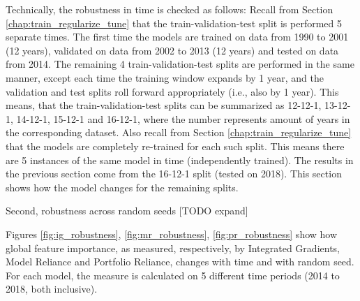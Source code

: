 		Technically, the robustness in time is checked as follows: Recall from Section \ref{chap:train_regularize_tune} that the train-validation-test split is performed 5 separate times. The first time the models are trained on data from 1990 to 2001 (12 years), validated on data from 2002 to 2013 (12 years) and tested on data from 2014. The remaining 4 train-validation-test splits are performed in the same manner, except each time the training window expands by 1 year, and the validation and test splits roll forward appropriately (i.e., also by 1 year). This means, that the train-validation-test splits can be summarized as 12-12-1, 13-12-1, 14-12-1, 15-12-1 and 16-12-1, where the number represents amount of years in the corresponding dataset. Also recall from Section \ref{chap:train_regularize_tune} that the models are completely re-trained for each such split. This means there are 5 instances of the same model in time (independently trained). The results in the previous section come from the 16-12-1 split (tested on 2018). This section shows how the model changes for the remaining splits.  
		
		Second, robustness across random seeds [TODO expand]
		
		Figures \ref{fig:ig_robustness}, \ref{fig:mr_robustness}, \ref{fig:pr_robustness} show how global feature importance, as measured, respectively, by Integrated Gradients, Model Reliance and Portfolio Reliance, changes with time and with random seed. For each model, the measure is calculated on 5 different time periods (2014 to 2018, both inclusive).
		

